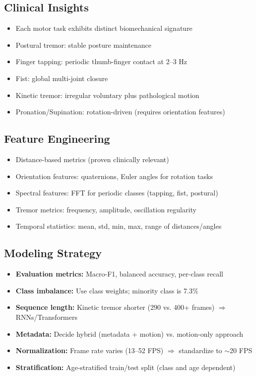 \documentclass[11pt,twocolumn]{article}
\begin{document}
\subsection{Clinical Insights}

\begin{itemize}
\item Each motor task exhibits distinct biomechanical signature
\item Postural tremor: stable posture maintenance
\item Finger tapping: periodic thumb-finger contact at 2--3 Hz
\item Fist: global multi-joint closure
\item Kinetic tremor: irregular voluntary plus pathological motion
\item Pronation/Supination: rotation-driven (requires orientation features)
\end{itemize}

\subsection{Feature Engineering}

\begin{itemize}
\item Distance-based metrics (proven clinically relevant)
\item Orientation features: quaternions, Euler angles for rotation tasks
\item Spectral features: FFT for periodic classes (tapping, fist, postural)
\item Tremor metrics: frequency, amplitude, oscillation regularity
\item Temporal statistics: mean, std, min, max, range of distances/angles
\end{itemize}

\subsection{Modeling Strategy}

\begin{itemize}
\item \textbf{Evaluation metrics:} Macro-F1, balanced accuracy, per-class recall
\item \textbf{Class imbalance:} Use class weights; minority class is 7.3\%
\item \textbf{Sequence length:} Kinetic tremor shorter (290 vs. 400+ frames) $\Rightarrow$ RNNs/Transformers
\item \textbf{Metadata:} Decide hybrid (metadata + motion) vs. motion-only approach
\item \textbf{Normalization:} Frame rate varies (13--52 FPS) $\Rightarrow$ standardize to $\sim$20 FPS
\item \textbf{Stratification:} Age-stratified train/test split (class and age dependent)
\end{itemize}
\newpage
\pagebreak
\\
\end{document}
